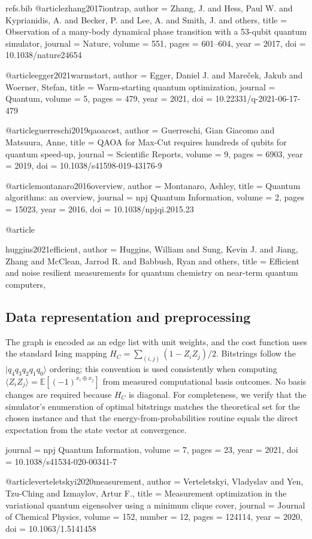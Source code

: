 \begin{filecontents*}{refs.bib}
@article{zhang2017iontrap,
  author  = {Zhang, J. and Hess, Paul W. and Kyprianidis, A. and Becker, P. and Lee, A. and Smith, J. and others},
  title   = {Observation of a many-body dynamical phase transition with a 53-qubit quantum simulator},
  journal = {Nature},
  volume  = {551},
  pages   = {601--604},
  year    = {2017},
  doi     = {10.1038/nature24654}
}

@article{egger2021warmstart,
  author  = {Egger, Daniel J. and Mare{\v{c}}ek, Jakub and Woerner, Stefan},
  title   = {Warm-starting quantum optimization},
  journal = {Quantum},
  volume  = {5},
  pages   = {479},
  year    = {2021},
  doi     = {10.22331/q-2021-06-17-479}
}

@article{guerreschi2019qaoacost,
  author  = {Guerreschi, Gian Giacomo and Matsuura, Anne},
  title   = {QAOA for Max-Cut requires hundreds of qubits for quantum speed-up},
  journal = {Scientific Reports},
  volume  = {9},
  pages   = {6903},
  year    = {2019},
  doi     = {10.1038/s41598-019-43176-9}
}

@article{montanaro2016overview,
  author  = {Montanaro, Ashley},
  title   = {Quantum algorithms: an overview},
  journal = {npj Quantum Information},
  volume  = {2},
  pages   = {15023},
  year    = {2016},
  doi     = {10.1038/npjqi.2015.23}
}

@article{huggins2021efficient,
  author  = {Huggins, William and Sung, Kevin J. and Jiang, Zhang and McClean, Jarrod R. and Babbush, Ryan and others},
  title   = {Efficient and noise resilient measurements for quantum chemistry on near-term quantum computers},

\subsection{Data representation and preprocessing}
The graph is encoded as an edge list with unit weights, and the cost function uses the standard Ising mapping $H_C=\sum_{(i,j)}(1-Z_iZ_j)/2$. Bitstrings follow the $|q_4 q_3 q_2 q_1 q_0\rangle$ ordering; this convention is used consistently when computing $\langle Z_iZ_j\rangle=\mathbb{E}[(-1)^{x_i\oplus x_j}]$ from measured computational basis outcomes. No basis changes are required because $H_C$ is diagonal. For completeness, we verify that the simulator’s enumeration of optimal bitstrings matches the theoretical set for the chosen instance and that the energy-from-probabilities routine equals the direct expectation from the state vector at convergence.

  journal = {npj Quantum Information},
  volume  = {7},
  pages   = {23},
  year    = {2021},
  doi     = {10.1038/s41534-020-00341-7}
}

@article{verteletskyi2020measurement,
  author  = {Verteletskyi, Vladyslav and Yen, Tzu-Ching and Izmaylov, Artur F.},
  title   = {Measurement optimization in the variational quantum eigensolver using a minimum clique cover},
  journal = {Journal of Chemical Physics},
  volume  = {152},
  number  = {12},
  pages   = {124114},
  year    = {2020},
  doi     = {10.1063/1.5141458}
}
\end{filecontents*}

